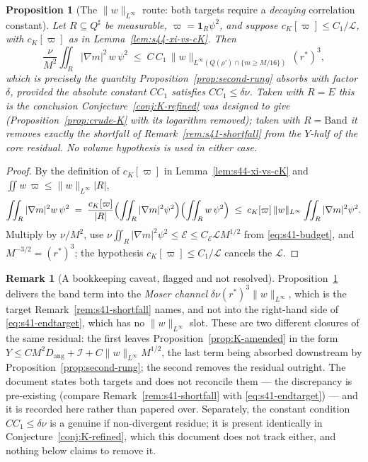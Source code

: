 \documentclass[11pt]{article}
\newtheorem{proposition}[theorem]{Proposition}
\theoremstyle{definition}
\newtheorem{remark}[theorem]{Remark}
\theoremstyle{remark}
\begin{document}
\begin{proposition}[The $\|w\|_{L^\infty}$ route: both targets require a
  \emph{decaying} correlation constant]\label{prop:s44-linfty-route}
  Let $R\subseteq Q^\sharp$ be measurable, $\varpi=\mathbf{1}_R\psi^2$, and
  suppose $c_K[\varpi]\leq C_1/\mathcal{L}$, with $c_K[\varpi]$ as in
  Lemma~\ref{lem:s44-xi-vs-cK}. Then
  \[
    \frac{\nu}{M^2}\iint_R|\nabla m|^2\,w\,\psi^2
    \;\leq\; C\,C_1\,
      \|w\|_{L^\infty(Q(\rho')\cap\{m\geq M/16\})}\,(r^*)^3 ,
  \]
  which is precisely the quantity Proposition~\ref{prop:second-rung} absorbs
  with factor $\delta$, provided the absolute constant $CC_1$ satisfies
  $CC_1\leq\delta\nu$. Taken with $R=E$ this is the conclusion
  Conjecture~\ref{conj:K-refined} was designed to give
  (Proposition~\ref{prop:crude-K} with its logarithm removed); taken with
  $R=\mathrm{Band}$ it removes exactly the shortfall of
  Remark~\ref{rem:s41-shortfall} from the $Y$-half of the core residual. No
  volume hypothesis is used in either case.
\end{proposition}
\begin{proof}
  By the definition of $c_K[\varpi]$ in Lemma~\ref{lem:s44-xi-vs-cK} and
  $\iint w\,\varpi\leq\|w\|_{L^\infty}|R|$,
  \[
    \iint_R|\nabla m|^2w\,\psi^2
    \;=\;\frac{c_K[\varpi]}{|R|}
      \Bigl(\iint_R|\nabla m|^2\psi^2\Bigr)
      \Bigl(\iint_R w\,\psi^2\Bigr)
    \;\leq\; c_K[\varpi]\,\|w\|_{L^\infty}\iint_R|\nabla m|^2\psi^2 .
  \]
  Multiply by $\nu/M^2$, use $\nu\iint_R|\nabla m|^2\psi^2\leq\mathcal{E}
  \leq C_{\mathcal{E}}\mathcal{L}M^{1/2}$ from \eqref{eq:s41-budget}, and
  $M^{-3/2}=(r^*)^3$; the hypothesis $c_K[\varpi]\leq C_1/\mathcal{L}$ cancels
  the $\mathcal{L}$.
\end{proof}

\begin{remark}[A bookkeeping caveat, flagged and not resolved]
  \label{rem:s44-channel-caveat}
  Proposition~\ref{prop:s44-linfty-route} delivers the band term into the
  \emph{Moser channel} $\delta\nu(r^*)^3\|w\|_{L^\infty}$, which is the target
  Remark~\ref{rem:s41-shortfall} names, and not into the right-hand side of
  \eqref{eq:s41-endtarget}, which has no $\|w\|_{L^\infty}$ slot. These are
  two different closures of the same residual: the first leaves
  Proposition~\ref{prop:K-amended} in the form
  $Y\leq CM^2D_{\mathrm{ang}}+\mathcal{I}+C\|w\|_{L^\infty}M^{1/2}$, the last
  term being absorbed downstream by Proposition~\ref{prop:second-rung}; the
  second removes the residual outright. The document states both targets and
  does not reconcile them --- the discrepancy is pre-existing (compare
  Remark~\ref{rem:s41-shortfall} with \eqref{eq:s41-endtarget}) --- and it is
  recorded here rather than papered over. Separately, the constant condition
  $CC_1\leq\delta\nu$ is a genuine if non-divergent residue; it is present
  identically in Conjecture~\ref{conj:K-refined}, which this document does not
  track either, and nothing below claims to remove it.
\end{remark}
\end{document}
